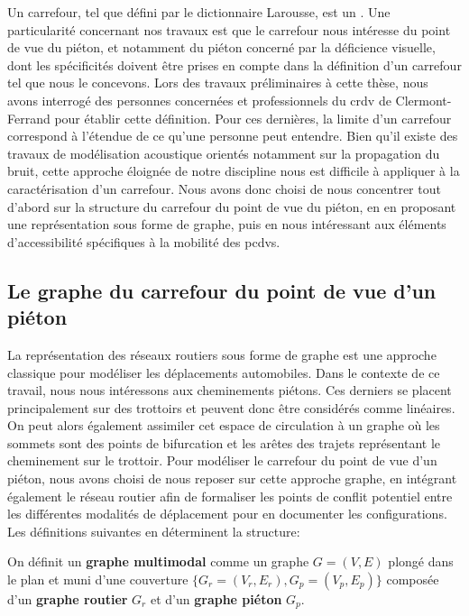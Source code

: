 Un carrefour, tel que défini par le dictionnaire Larousse, est un . Une particularité concernant nos travaux est que le carrefour nous intéresse du point de vue du piéton, et notamment du piéton concerné par la déficience visuelle, dont les spécificités doivent être prises en compte dans la définition d'un carrefour tel que nous le concevons. Lors des travaux préliminaires à cette thèse, nous avons interrogé des personnes concernées et professionnels du \gls{crdv} de Clermont-Ferrand pour établir cette définition. Pour ces dernières, la limite d'un carrefour correspond à l'étendue de ce qu'une personne peut entendre. Bien qu'il existe des travaux de modélisation acoustique \citep{Bullen1977} orientés notamment sur la propagation du bruit, cette approche éloignée de notre discipline nous est difficile à appliquer à la caractérisation d'un carrefour. Nous avons donc choisi de nous concentrer tout d'abord sur la structure du carrefour du point de vue du piéton, en en proposant une représentation sous forme de graphe, puis en nous intéressant aux éléments d'accessibilité spécifiques à la mobilité des \glspl{pcdv}.

\newpage
\subsection{Le graphe du carrefour du point de vue d'un piéton}

\label{sec:modelisation_definitions}

La représentation des réseaux routiers sous forme de graphe est une approche classique pour modéliser les déplacements automobiles. Dans le contexte de ce travail, nous nous intéressons aux cheminements piétons. Ces derniers se placent principalement sur des trottoirs et peuvent donc être considérés comme linéaires. On peut alors également assimiler cet espace de circulation à un graphe où les sommets sont des points de bifurcation et les arêtes des trajets représentant le cheminement sur le trottoir. Pour modéliser le carrefour du point de vue d'un piéton, nous avons choisi de nous reposer sur cette approche graphe, en intégrant également le réseau routier afin de formaliser les points de conflit potentiel entre les différentes modalités de déplacement pour en documenter les configurations. Les définitions suivantes en déterminent la structure:

\begin{definition}
    On définit un \textbf{graphe multimodal} comme un graphe $G = (V,E)$ plongé dans le plan et muni d'une couverture $\{G_r=(V_r, E_r), G_p = (V_p, E_p)\}$ composée d'un \textbf{graphe routier} $G_r$ et d'un \textbf{graphe piéton} $G_p$.
\end{definition}

